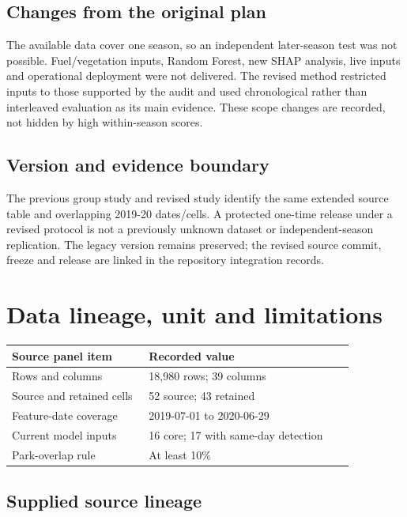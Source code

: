 \subsection*{Changes from the original plan}

The available data cover one season, so an independent later-season test was not possible. Fuel/vegetation inputs, Random Forest, new SHAP analysis, live inputs and operational deployment were not delivered. The revised method restricted inputs to those supported by the audit and used chronological rather than interleaved evaluation as its main evidence. These scope changes are recorded, not hidden by high within-season scores.

\subsection*{Version and evidence boundary}

The previous group study and revised study identify the same extended source table and overlapping 2019-20 dates/cells. A protected one-time release under a revised protocol is not a previously unknown dataset or independent-season replication. The legacy version remains preserved; the revised source commit, freeze and release are linked in the repository integration records.

\clearpage
\section*{Data lineage, unit and limitations}
\begin{center}\small\setlength{\tabcolsep}{3pt}
\begin{tabular}{p{0.344\linewidth}p{0.516\linewidth}}
\hline
Source panel item & Recorded value \\ \hline
Rows and columns & 18,980 rows; 39 columns \\
Source and retained cells & 52 source; 43 retained \\
Feature-date coverage & 2019-07-01 to 2020-06-29 \\
Current model inputs & 16 core; 17 with same-day detection \\
Park-overlap rule & At least 10\% \\
\hline\end{tabular}\end{center}

\subsection*{Supplied source lineage}

